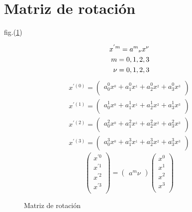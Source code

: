 \section{Matriz de rotaci\'on}

fig.(\ref{permutaciones_tree})\\
\begin{figure}[h]
		\begin{eqnarray*}
			x^{'m} = a^{m}\hfill_{\nu} x^{\nu}\\
			m = 0,1,2,3\\
			\nu = 0,1,2,3
		\end{eqnarray*}		
		\begin{eqnarray*}
			x^{'(0)} =
			\left( {\begin{array}{cc}
					a^{0} _0 x^{_0} + a^{0} _1 x^{_1} + a^{0} _2 x^{_2} + a^{0} _3 x^{_3}\\
			\end{array} } \right)\\
		x^{'(1)} =
		\left( {\begin{array}{cc}
				a^{1} _0 x^{_0} + a^{1} _1 x^{_1} + a^{1} _2 x^{_2} + a^{1} _3 x^{_3}\\
		\end{array} } \right)\\
		x^{'(2)} =
		\left( {\begin{array}{cc}
				a^{2} _0 x^{_0} + a^{2} _1 x^{_1} + a^{2} _2 x^{_2} + a^{2} _3 x^{_3}\\
		\end{array} } \right)\\
		x^{'(3)} =
		\left( {\begin{array}{cc}
				a^{3} _0 x^{_0} + a^{3} _1 x^{_1} + a^{3} _2 x^{_2} + a^{3} _3 x^{_3}\\
		\end{array} } \right)
		\end{eqnarray*}
		\begin{equation*}
			\left(
			\begin{array}{ccc}
				x^{'0}\\
				x^{'1}\\
				x^{'2}\\
				x^{'3}\\ 
			\end{array}
			\right)
			=
			\left(
			\begin{array}{c}
				a^{m}\nu
			\end{array}
			\right)
			{}
			\left(
			\begin{array}{ccc}
				x^{0}\\
				x^{1}\\
				x^{2}\\
				x^{3}\\ 
			\end{array}
			\right)
		\end{equation*}		
	\caption{Matriz de rotaci\'on}
	\label{permutaciones_tree}
\end{figure}